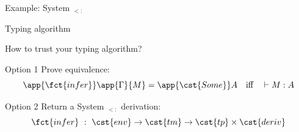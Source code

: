 \begin{frame}{\textcolor{greenish}{Example:} System $_{<:}$}
  \begin{block}{Typing algorithm}
    \begin{overlayarea}\textwidth{8em}
      \large {}




\end{overlayarea}
  \end{block}
\end{frame}

\begin{frame}{How to trust your typing algorithm?}
  \begin{block}{Option 1}
    Prove equivalence:
    $$
    \app{\fct{infer}}\app{\Gamma}{M}=\app{\cst{Some}} A
    \quad\text{iff}\quad
    \vdash M : A
    $$
  \end{block}
  \pause
  \begin{block}{Option 2}
    Return a System $_{<:}$ derivation:
    $$
    \fct{infer}\ :\ \cst{env}\to\cst{tm}\to\cst{tp}\times\cst{deriv}
    $$
  \end{block}
\end{frame}

